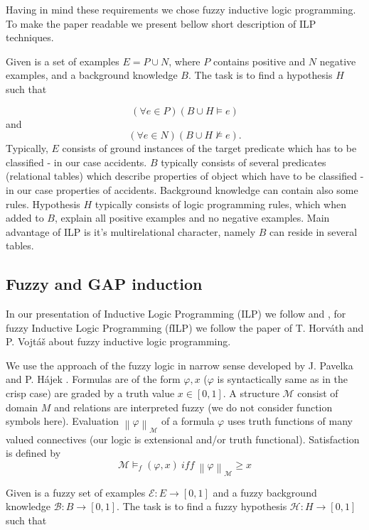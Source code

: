 \documentclass[authoryear,12pt]{elsarticle}
\begin{document}
Having in mind these requirements we chose fuzzy inductive logic programming. To make the paper readable we present bellow short description of ILP techniques.
%

Given is a set of examples $E=P\cup N$, where $P$ contains positive and $N$ negative examples, and a background knowledge $B$. The task is to find a hypothesis $H$ such that 

$$
(\forall e\in P)(B\cup H\models e)
$$
and
$$
(\forall e\in N)(B\cup H\not\models e).
$$
Typically, $E$ consists of ground instances of the target predicate which has to be classified - in our case accidents. $B$ typically consists of several predicates (relational tables) which describe properties of object which have to be classified - in our case properties of accidents. Background knowledge can contain also some rules. Hypothesis $H$ typically consists of logic programming rules, which when added to $B$, explain all positive examples and no negative examples.
%
Main advantage of ILP is it's multirelational character, namely $B$ can reside in several tables.



\subsection{Fuzzy and GAP induction}

In our presentation of Inductive Logic Programming (ILP) we follow \cite{dzeroski2001:relat_dm} and  \cite{biblio:Muggleton94inductivelogic}, for fuzzy Inductive Logic Programming (fILP) we follow the paper of T. Horv\'ath and P. Vojt\'a\v s \citep{biblio:FILP} about fuzzy inductive logic programming.

We use the approach of the fuzzy logic in narrow sense developed by J. Pavelka \citep{biblio:Pavelka} and P. H\'ajek \citep{biblio:Hajek}. Formulas are of the form $\varphi, x$ ($\varphi$ is syntactically same as in the crisp case) are graded by a truth value $x\in [0,1]$.
A structure ${\mathcal M}$ consist of domain $M$ and relations are interpreted fuzzy (we do not consider function symbols here). Evaluation $\left\|\varphi\right\|_{{\mathcal M}}$ of a formula $\varphi$ uses truth functions of many valued connectives (our logic is extensional and/or truth functional). Satisfaction is defined by 
$${\mathcal M}\models_f (\varphi, x)\ iff\ \left\|\varphi\right\|_{{\mathcal M}}\ge x$$

Given is a fuzzy set of examples ${\mathcal E}:E\longrightarrow [0,1]$ and a fuzzy background knowledge ${\mathcal B}:B\longrightarrow [0,1]$. The task is to find a fuzzy hypothesis ${\mathcal H}:H\longrightarrow [0,1]$ such that 
\end{document}
